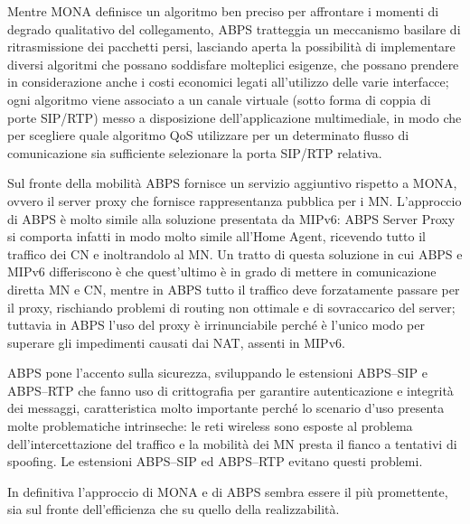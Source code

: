 \documentclass[12pt,a4paper,openright,twoside]{book}
\begin{document}
Mentre MONA definisce un algoritmo ben preciso per affrontare i
momenti di degrado qualitativo del collegamento, ABPS tratteggia un
meccanismo basilare di ritrasmissione dei pacchetti persi, lasciando
aperta la possibilità di implementare diversi algoritmi che possano
soddisfare molteplici esigenze, che possano prendere in considerazione
anche i costi economici legati all'utilizzo delle varie interfacce;
ogni algoritmo viene associato a un canale virtuale (sotto forma di
coppia di porte SIP/RTP) messo a disposizione dell'applicazione
multimediale, in modo che per scegliere quale algoritmo QoS utilizzare
per un determinato flusso di comunicazione sia sufficiente selezionare
la porta SIP/RTP relativa.

Sul fronte della mobilità ABPS fornisce un servizio aggiuntivo
rispetto a MONA, ovvero il server proxy che fornisce rappresentanza
pubblica per i MN. L'approccio di ABPS è molto simile alla soluzione
presentata da MIPv6: ABPS Server Proxy si comporta infatti in modo
molto simile all'Home Agent, ricevendo tutto il traffico dei CN e
inoltrandolo al MN. Un tratto di questa soluzione in cui ABPS e MIPv6
differiscono è che quest'ultimo è in grado di mettere in comunicazione
diretta MN e CN, mentre in ABPS tutto il traffico deve forzatamente
passare per il proxy, rischiando problemi di routing non ottimale e di
sovraccarico del server; tuttavia in ABPS l'uso del proxy è
irrinunciabile perché è l'unico modo per superare gli impedimenti
causati dai NAT, assenti in MIPv6.

ABPS pone l'accento sulla sicurezza, sviluppando le estensioni
ABPS--SIP e ABPS--RTP che fanno uso di crittografia per garantire
autenticazione e integrità dei messaggi, caratteristica molto
importante perché lo scenario d'uso presenta molte problematiche
intrinseche: le reti wireless sono esposte al problema
dell'intercettazione del traffico e la mobilità dei MN presta il
fianco a tentativi di spoofing. Le estensioni ABPS--SIP ed ABPS--RTP
evitano questi problemi.

In definitiva l'approccio di MONA e di ABPS sembra essere il più
promettente, sia sul fronte dell'efficienza che su quello della
realizzabilità.

\clearpage{\pagestyle{empty}\cleardoublepage}
\end{document}
